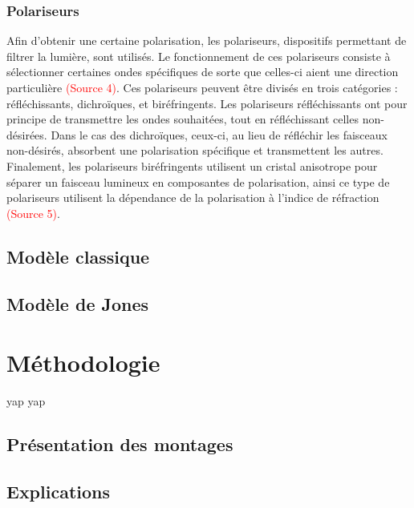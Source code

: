 \documentclass[11pt,letterpaper]{article}
\begin{document}
\subsubsection{Polariseurs}
Afin d'obtenir une certaine polarisation, les polariseurs, dispositifs permettant de filtrer la lumière, sont utilisés. Le fonctionnement de ces polariseurs consiste à sélectionner certaines ondes spécifiques de sorte que celles-ci aient une direction particulière \textcolor{red}{(Source 4)}. Ces polariseurs peuvent être divisés en trois catégories : réfléchissants, dichroïques, et biréfringents. Les polariseurs réfléchissants ont pour principe de transmettre les ondes souhaitées, tout en réfléchissant celles non-désirées. Dans le cas des dichroïques, ceux-ci, au lieu de réfléchir les faisceaux non-désirés, absorbent une polarisation spécifique et transmettent les autres. Finalement, les polariseurs biréfringents utilisent un cristal anisotrope pour séparer un faisceau lumineux en composantes de polarisation, ainsi ce type de polariseurs utilisent la dépendance de la polarisation à l'indice de réfraction \textcolor{red}{(Source 5)}.



\subsection{Modèle classique}

\subsection{Modèle de Jones}



\section{Méthodologie}

yap yap

\subsection{Présentation des montages}

\subsection{Explications}
\end{document}
